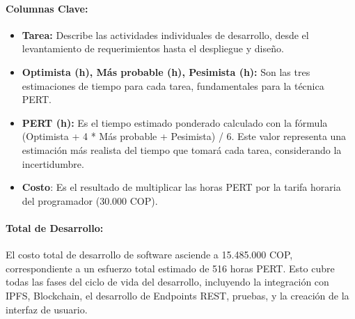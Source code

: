 \paragraph{Columnas Clave: }
\begin{itemize}
\item \textbf{Tarea:} Describe las actividades individuales de desarrollo, desde el levantamiento de requerimientos hasta el despliegue y diseño. 

\item \textbf{Optimista (h), Más probable (h), Pesimista (h):} Son las tres estimaciones de tiempo para cada tarea, fundamentales para la técnica PERT. 

\item \textbf{PERT (h): }Es el tiempo estimado ponderado calculado con la fórmula (Optimista + 4 * Más probable + Pesimista) / 6. Este valor representa una estimación más realista del tiempo que tomará cada tarea, considerando la incertidumbre. 

\item \textbf{Costo}: Es el resultado de multiplicar las horas PERT por la tarifa horaria del programador (30.000 COP). 
\end{itemize}
 

\paragraph{Total de Desarrollo:} El costo total de desarrollo de software asciende a 15.485.000 COP, correspondiente a un esfuerzo total estimado de 516 horas PERT. Esto cubre todas las fases del ciclo de vida del desarrollo, incluyendo la integración con IPFS, Blockchain, el desarrollo de Endpoints REST, pruebas, y la creación de la interfaz de usuario. 